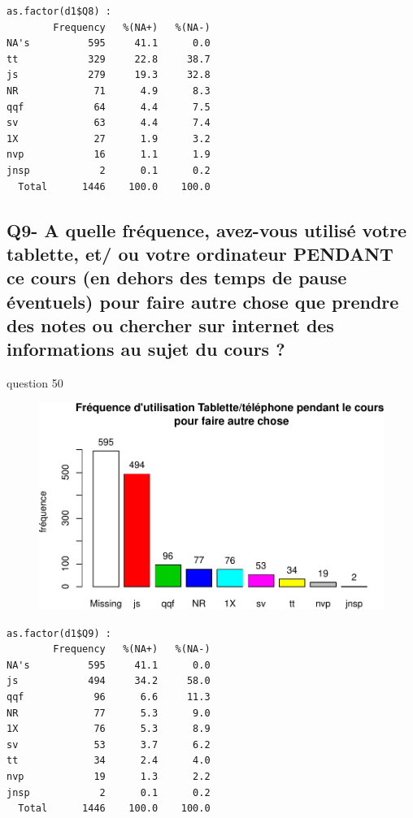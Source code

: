 \documentclass[]{article}
\begin{document}
\begin{verbatim}
as.factor(d1$Q8) : 
        Frequency   %(NA+)   %(NA-)
NA's          595     41.1      0.0
tt            329     22.8     38.7
js            279     19.3     32.8
NR             71      4.9      8.3
qqf            64      4.4      7.5
sv             63      4.4      7.4
1X             27      1.9      3.2
nvp            16      1.1      1.9
jnsp            2      0.1      0.2
  Total      1446    100.0    100.0
\end{verbatim}

\subsection{Q9- A quelle fréquence, avez-vous utilisé votre tablette,
et/ ou votre ordinateur PENDANT ce cours (en dehors des temps de pause
éventuels) pour faire autre chose que prendre des notes ou chercher sur
internet des informations au sujet du cours
?}\label{q9--a-quelle-frequence-avez-vous-utilise-votre-tablette-et-ou-votre-ordinateur-pendant-ce-cours-en-dehors-des-temps-de-pause-eventuels-pour-faire-autre-chose-que-prendre-des-notes-ou-chercher-sur-internet-des-informations-au-sujet-du-cours}

question 50

\begin{figure}[htbp]
\centering
\includegraphics{qs_etudiants_files/figure-latex/utilisation4-1.pdf}
\end{figure}

\begin{verbatim}
as.factor(d1$Q9) : 
        Frequency   %(NA+)   %(NA-)
NA's          595     41.1      0.0
js            494     34.2     58.0
qqf            96      6.6     11.3
NR             77      5.3      9.0
1X             76      5.3      8.9
sv             53      3.7      6.2
tt             34      2.4      4.0
nvp            19      1.3      2.2
jnsp            2      0.1      0.2
  Total      1446    100.0    100.0
\end{verbatim}
\end{document}
